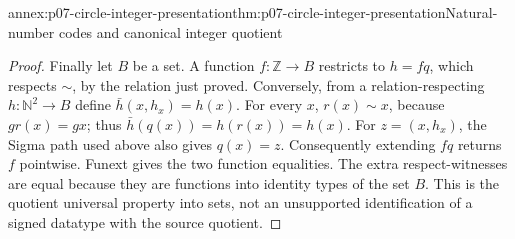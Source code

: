 \begin{annexitem}{annex:p07-circle-integer-presentation}{thm:p07-circle-integer-presentation}{Natural-number codes and canonical integer quotient}
\begin{proof}
Finally let \(B\) be a set. A function \(f:\mathbb Z\to B\)
restricts to \(h=fq\), which respects \(\sim\), by the relation just
proved. Conversely, from a relation-respecting \(h:\mathbb N^2\to B\)
define \(\bar h(x,h_x)=h(x)\).
For every \(x\), \(r(x)\sim x\), because \(gr(x)=gx\);
thus \(\bar h(q(x))=h(r(x))=h(x)\).
For \(z=(x,h_x)\), the Sigma path used above also gives \(q(x)=z\).
Consequently extending \(fq\) returns \(f\) pointwise. Funext gives
the two function equalities. The extra respect-witnesses are equal
because they are functions into identity types of the set \(B\).
This is the quotient universal property into sets, not an unsupported
identification of a signed datatype with the source quotient.
\end{proof}
\end{annexitem}

